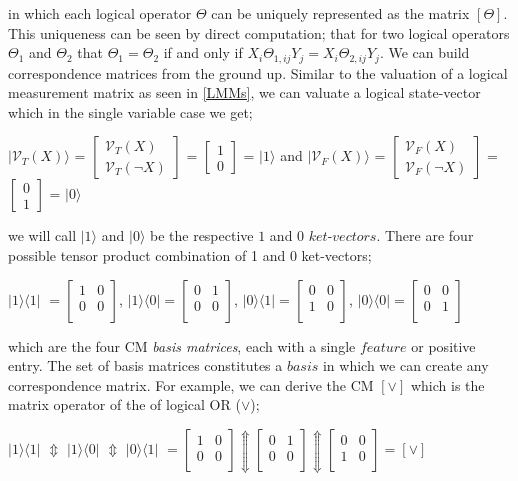 \documentclass[10pt]{article}
\newcommand{\otbk}[1]{$|{#1} \rangle \langle {#1}|$}
\newcommand{\otbktwo}[2]{$|{#1} \rangle \langle {#2}|$}
\newcommand{\ket}[1]{$|{#1}\rangle$}
\newcommand{\twobyone}[2]{$\begin{bmatrix} {#1} \\ {#2} \end{bmatrix}$}
\begin{document}
in which each logical operator $\Theta$ can be uniquely represented as the matrix $[\Theta]$. This uniqueness can be seen by direct computation; that for two logical operators $\Theta_1$ and $\Theta_2$ that $\Theta_1 = \Theta_2$ if and only if $X_i \Theta_{1,ij} Y_j = X_i \Theta_{2,ij} Y_j $.\label{CorrespondenceMatrices} We can build correspondence matrices from the ground up. Similar to the valuation of a logical measurement matrix as seen in \ref{LMMs}, we can valuate a logical state-vector which in the single variable case we get;
\begin{center}
\ket{\mathcal{V}_T(X)} = \twobyone{\mathcal{V}_T(X)}{\mathcal{V}_T(\neg X)} = \twobyone{1}{0} = \ket{1} and \ket{\mathcal{V}_F(X)} =  \twobyone{\mathcal{V}_F(X)}{\mathcal{V}_F(\neg X)} = \twobyone{0}{1} = \ket{0}
\end{center}
we will call \ket{1} and \ket{0} be the respective $1$ and $0$ $\textit{ket-vectors}$. There are four possible tensor product combination of 1 and 0 ket-vectors;
\begin{center}
\otbk{1} $= \begin{bmatrix} 1 & 0\\ 0 & 0\\ \end{bmatrix}$, \otbktwo{1}{0}$ = \begin{bmatrix} 0 & 1\\ 0 & 0\\ \end{bmatrix}$, \otbktwo{0}{1}$ = \begin{bmatrix} 0 & 0\\ 1 & 0\\ \end{bmatrix}$, \otbk{0}$ = \begin{bmatrix} 0 & 0\\ 0 & 1\\ \end{bmatrix}$
\end{center}
which are the four CM \textit{basis matrices}, each with a single $\textit{feature}$ or positive entry. The set of basis matrices constitutes a $\textit{basis}$ in which we can create any correspondence matrix. For example, we can derive the CM $[\vee]$ which is the matrix operator of the of logical OR ($\vee$);
\begin{center}
\otbktwo{1}{1} $\Updownarrow$ \otbktwo{1}{0} $\Updownarrow$ \otbktwo{0}{1}  $ = \begin{bmatrix} 1 & 0\\ 0 & 0\\ \end{bmatrix} \Updownarrow \begin{bmatrix} 0 & 1\\ 0 & 0\\ \end{bmatrix} \Updownarrow \begin{bmatrix} 0 & 0\\ 1 & 0\\ \end{bmatrix} = [\vee]$
\end{center}\label{CorrespondenceMatricesFig}
\end{document}
